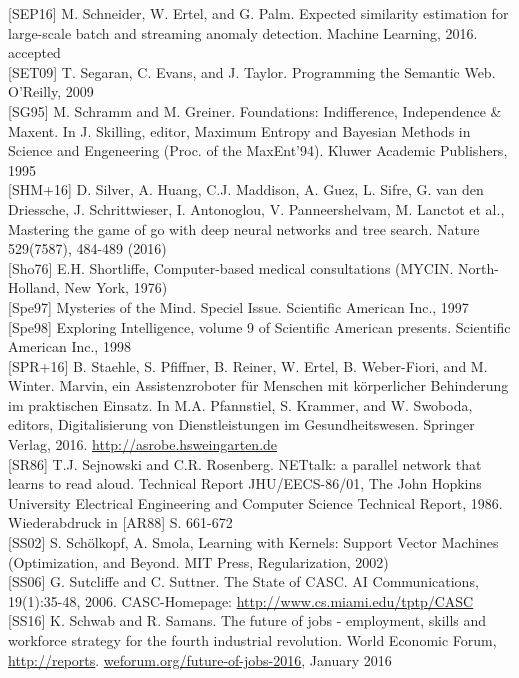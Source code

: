 \documentclass[10pt]{article}
\begin{document}
[SEP16] M. Schneider, W. Ertel, and G. Palm. Expected similarity estimation for large-scale batch and streaming anomaly detection. Machine Learning, 2016. accepted\\[0pt]
[SET09] T. Segaran, C. Evans, and J. Taylor. Programming the Semantic Web. O'Reilly, 2009\\[0pt]
[SG95] M. Schramm and M. Greiner. Foundations: Indifference, Independence \& Maxent. In J. Skilling, editor, Maximum Entropy and Bayesian Methods in Science and Engeneering (Proc. of the MaxEnt'94). Kluwer Academic Publishers, 1995\\[0pt]
[SHM+16] D. Silver, A. Huang, C.J. Maddison, A. Guez, L. Sifre, G. van den Driessche, J. Schrittwieser, I. Antonoglou, V. Panneershelvam, M. Lanctot et al., Mastering the game of go with deep neural networks and tree search. Nature 529(7587), 484-489 (2016)\\[0pt]
[Sho76] E.H. Shortliffe, Computer-based medical consultations (MYCIN. North-Holland, New York, 1976)\\[0pt]
[Spe97] Mysteries of the Mind. Speciel Issue. Scientific American Inc., 1997\\[0pt]
[Spe98] Exploring Intelligence, volume 9 of Scientific American presents. Scientific American Inc., 1998\\[0pt]
[SPR+16] B. Staehle, S. Pfiffner, B. Reiner, W. Ertel, B. Weber-Fiori, and M. Winter. Marvin, ein Assistenzroboter für Menschen mit körperlicher Behinderung im praktischen Einsatz. In M.A. Pfannstiel, S. Krammer, and W. Swoboda, editors, Digitalisierung von Dienstleistungen im Gesundheitswesen. Springer Verlag, 2016. \href{http://asrobe.hsweingarten.de}{http://asrobe.hsweingarten.de}\\[0pt]
[SR86] T.J. Sejnowski and C.R. Rosenberg. NETtalk: a parallel network that learns to read aloud. Technical Report JHU/EECS-86/01, The John Hopkins University Electrical Engineering and Computer Science Technical Report, 1986. Wiederabdruck in [AR88] S. 661-672\\[0pt]
[SS02] S. Schölkopf, A. Smola, Learning with Kernels: Support Vector Machines (Optimization, and Beyond. MIT Press, Regularization, 2002)\\[0pt]
[SS06] G. Sutcliffe and C. Suttner. The State of CASC. AI Communications, 19(1):35-48, 2006. CASC-Homepage: \href{http://www.cs.miami.edu/tptp/CASC}{http://www.cs.miami.edu/tptp/CASC}\\[0pt]
[SS16] K. Schwab and R. Samans. The future of jobs - employment, skills and workforce strategy for the fourth industrial revolution. World Economic Forum, \href{http://reports}{http://reports}. \href{http://weforum.org/future-of-jobs-2016}{weforum.org/future-of-jobs-2016}, January 2016\\[0pt]
\end{document}
